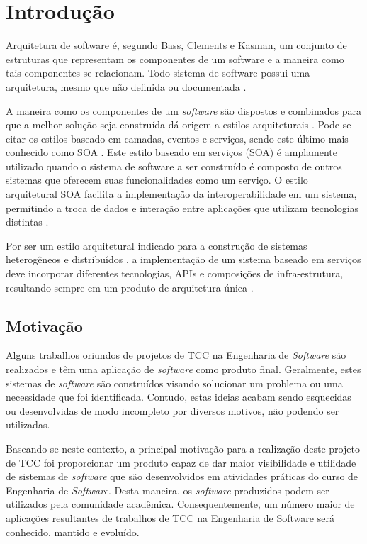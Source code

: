 \chapter[Introdução]{Introdução}
Arquitetura de software é, segundo Bass, Clements e Kasman\cite{bass_software_archi_practice_2003}, um conjunto de estruturas que representam os componentes de um software e a maneira como tais componentes se relacionam. Todo sistema de software possui uma arquitetura, mesmo que não definida ou documentada \cite{bass_software_archi_practice_2003}.

A maneira como os componentes de um \textit{software} são dispostos e combinados para que a melhor solução seja construída dá origem a estilos arquiteturais \cite{pressman2006engenharia}. Pode-se citar os estilos baseado em camadas, eventos e serviços, sendo este último mais conhecido como SOA \cite{josuttis_soa_2007}. Este estilo baseado em serviços (SOA) é amplamente utilizado quando o sistema de software a ser construído é composto de outros sistemas que oferecem suas funcionalidades como um serviço. O estilo arquitetural SOA facilita a implementação da interoperabilidade em um sistema, permitindo a troca de dados e interação entre aplicações que utilizam tecnologias distintas \cite{oqueesoa_2010}.

Por ser um estilo arquitetural indicado para a construção de sistemas heterogêneos e distribuídos \cite{josuttis_soa_2007}, a implementação de um sistema baseado em serviços deve incorporar diferentes tecnologias, APIs e composições de infra-estrutura, resultando sempre em um produto de arquitetura única \cite{erl_orientacaoaservico_2009}.

\section{Motivação}
Alguns trabalhos oriundos de projetos de TCC na Engenharia de \textit{Software} são realizados e têm uma aplicação de \textit{software} como produto final. Geralmente, estes sistemas de \textit{software} são construídos visando solucionar um problema ou uma necessidade que foi identificada. Contudo, estas ideias acabam sendo esquecidas ou desenvolvidas de modo incompleto por diversos motivos, não podendo ser utilizadas.

Baseando-se neste contexto, a principal motivação para a realização deste projeto de TCC foi proporcionar um produto capaz de dar maior visibilidade e utilidade de sistemas de \textit{software} que são desenvolvidos em atividades práticas do curso de Engenharia de \textit{Software}. Desta maneira, os \textit{software} produzidos podem ser utilizados pela comunidade acadêmica. Consequentemente, um número maior de aplicações resultantes de trabalhos de TCC na Engenharia de Software será conhecido, mantido e evoluído. 

